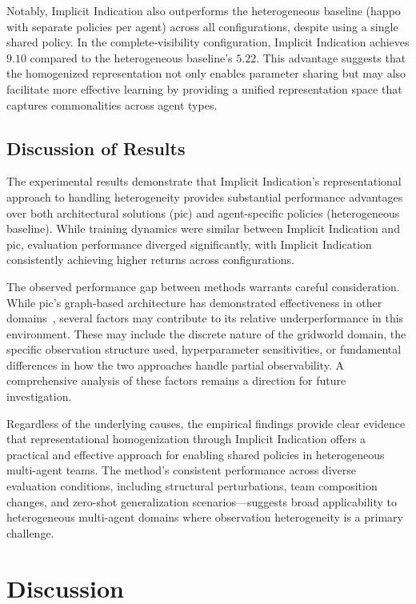 \documentclass[conference]{IEEEtran}
\begin{document}
Notably, Implicit Indication also outperforms the heterogeneous baseline 
(\gls{happo} with separate policies per agent) across all configurations, 
despite using a single shared policy. In the complete-visibility configuration, 
Implicit Indication achieves $9.10$ compared to the heterogeneous baseline's $5.22$. 
This advantage suggests that the homogenized representation not only enables parameter 
sharing but may also facilitate more effective learning by providing a unified 
representation space that captures commonalities across agent types.

\subsection{Discussion of Results}

The experimental results demonstrate that Implicit Indication's 
representational approach to handling heterogeneity provides 
substantial performance advantages over both architectural 
solutions (\gls{pic}) and agent-specific policies (heterogeneous baseline). 
While training dynamics were similar between Implicit Indication and \gls{pic}, 
evaluation performance diverged significantly, with Implicit Indication 
consistently achieving higher returns across configurations.

The observed performance gap between methods warrants careful consideration. 
While \gls{pic}'s graph-based architecture has demonstrated effectiveness in 
other domains~\cite{liu2020b}, several factors may contribute to its relative 
underperformance in this environment. 
These may include the discrete nature of the gridworld domain, 
the specific observation structure used, hyperparameter sensitivities, 
or fundamental differences in how the two approaches handle partial observability. 
A comprehensive analysis of these factors remains a direction for future investigation.

Regardless of the underlying causes, the empirical findings provide clear evidence 
that representational homogenization through Implicit Indication offers a practical 
and effective approach for enabling shared policies in heterogeneous multi-agent teams. 
The method's consistent performance across diverse evaluation conditions, 
including structural perturbations, team composition changes, 
and zero-shot generalization scenarios—suggests broad applicability to 
heterogeneous multi-agent domains where observation heterogeneity is a primary challenge.

\section{Discussion}
\end{document}
